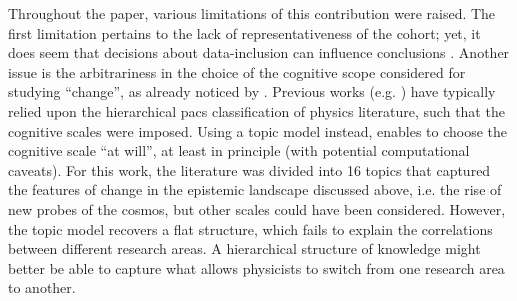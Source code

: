 \documentclass{article}
\begin{document}
Throughout the paper, various limitations of this contribution were raised. The first limitation pertains to the lack of representativeness of the cohort; yet, it does seem that decisions about data-inclusion can influence conclusions \citep{Aleta2019}. Another issue is the arbitrariness in the choice of the cognitive scope considered for studying ``change'', as already noticed by \citet{Gieryn1978}. Previous works (e.g. \citealt{Tripodi2020,Aleta2019,Battiston2019,Jia2017}) have typically relied upon the hierarchical \gls{pacs} classification of physics literature, such that the cognitive scales were imposed. Using a topic model instead, enables to choose the cognitive scale ``at will'', at least in principle (with potential computational caveats). For this work, the literature was divided into 16 topics that captured the features of change in the epistemic landscape discussed above, i.e. the rise of new probes of the cosmos, but other scales could have been considered. However, the topic model recovers a flat structure, which fails to explain the correlations between different research areas. A hierarchical structure of knowledge might better be able to capture what allows physicists to switch from one research area to another. 



\end{document}
